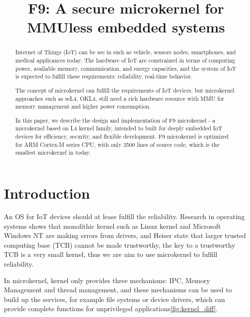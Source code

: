 \documentclass[10pt,preprint,nocopyrightspace]{sigplanconf}
\date{}
\begin{document}
\title{F9: A secure microkernel for MMUless embedded systems}
\maketitle

\begin{abstract}\textsl{}
	
Internet of Things (IoT) can be see in such as vehicle, sensors nodes, smartphones, and medical applicances today. The hardware of IoT are constrained in terms of computing power, avaliable memory, communication, and energy capacities, and the system of IoT is expected to fulfill these requirements: reliability, real-time behavior. 

The concept of microkernel can fulfill the requirements of IoT devices, but microkernel approaches such as seL4, OKL4, still need a rich hardware resource with MMU for memory management and higher power consumption.

In this paper, we describe the design and implementation of F9 microkernel - a microkernel based on L4 kernel family, intended to built for deeply embedded IoT devices for efficiency, security, and flexible development. F9 microkernel is optimized for ARM Cortex-M series CPU, with only 3500 lines of source code, which is the smallest microkernel in today.

\end{abstract}

\section{Introduction}

An OS for IoT devices should at lease fulfill the reliability\cite{baccelli2013riot}. Research in operating systems shows that monolithic kernel such as Linux kernel\cite{chou2001empirical} and Microsoft Windows NT\cite{swift2005improving} are making errors from drivers, and Heiser state that larger trusted computing base (TCB) cannot be made trustworthy, the key to a trustworthy TCB is a very small kernel\cite{heiser2005secure}, thus we are aim to use microkernel to fulfill reliability.

In microkernel, kernel only provides three mechanisms: IPC, Memory Management and thread management, and these mechanisms can be used to build up the services, for example file systems or device drivers, which can provide complete functions for unprivileged applications\ref{fig:kernel_diff}.
\end{document}
